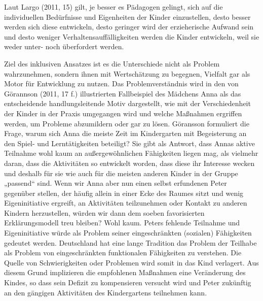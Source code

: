 Laut Largo (2011, 15) gilt, je besser es Pädagogen gelingt, sich auf die individuellen Bedürfnisse und Eigenheiten der Kinder einzustellen, desto besser werden sich diese entwickeln, desto geringer wird der erzieherische Aufwand sein und desto weniger Verhaltensauffälligkeiten werden die Kinder entwickeln, weil sie weder unter- noch überfordert werden.   

Ziel des inklusiven Ansatzes ist es die Unterschiede nicht als Problem wahrzunehmen, sondern ihnen mit Wertschätzung zu begegnen, Vielfalt gar als Motor für Entwicklung zu nutzen. Das Problemverständnis wird in den von Görannson (2011, 17 f.) illustrierten Fallbeispiel des Mädchens Anna als das entscheidende handlungsleitende Motiv dargestellt, wie mit der Verschiedenheit der Kinder in der Praxis umgegangen wird und welche Maßnahmen ergriffen werden, um Probleme abzumildern oder gar zu lösen. Göransson formuliert die Frage, warum sich Anna die meiste Zeit im Kindergarten mit Begeisterung an den Spiel- und Lerntätigkeiten beteiligt? Sie gibt als Antwort, dass Annas aktive Teilnahme wohl kaum an außergewöhnlichen Fähigkeiten liegen mag, als vielmehr daran, dass die Aktivitäten so entwickelt worden, dass diese ihr Interesse wecken und deshalb für sie wie auch für die meisten anderen Kinder in der Gruppe „passend“ sind. Wenn wir Anna aber nun einen selbst erfundenen Peter gegenüber stellen, der häufig allein in einer Ecke des Raumes sitzt und wenig Eigeninitiative ergreift, an Aktivitäten teilzunehmen oder Kontakt zu anderen Kindern herzustellen, würden wir dann dem soeben favorisierten Erklärungsmodell treu bleiben? Wohl kaum. Peters fehlende Teilnahme und Eigeninitiative würde als Problem seiner eingeschränkten (sozialen) Fähigkeiten gedeutet werden. Deutschland hat eine lange Tradition das Problem der Teilhabe als Problem von eingeschränkten funktionalen Fähigkeiten zu verstehen. Die Quelle von Schwierigkeiten oder Problemen wird somit in das Kind verlagert. Aus diesem Grund implizieren die empfohlenen Maßnahmen eine Veränderung des Kindes, so dass sein Defizit zu kompensieren versucht wird und Peter zukünftig an den gängigen Aktivitäten des Kindergartens teilnehmen kann. 

